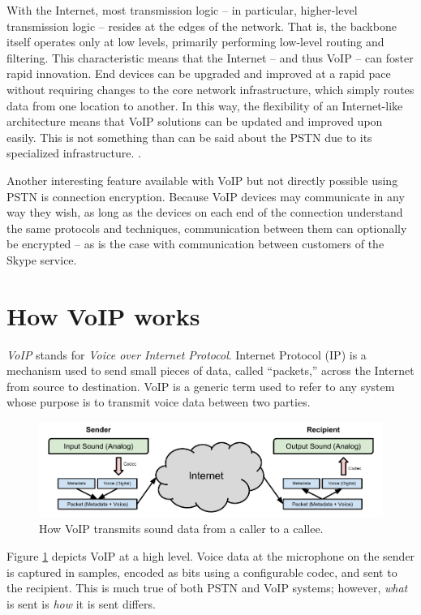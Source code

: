 \documentclass[11pt]{article}
\newcommand{\term}[1]{\textit{#1}}
\begin{document}
With the Internet, most transmission logic -- in particular, higher-level
transmission logic -- resides at the edges of the network. That is, the backbone
itself operates only at low levels, primarily performing low-level routing and
filtering. This characteristic means that the Internet -- and thus VoIP -- can
foster rapid innovation. End devices can be upgraded and improved at a rapid
pace without requiring changes to the core network infrastructure, which simply
routes data from one location to another. In this way, the flexibility of an
Internet-like architecture means that VoIP solutions can be updated and improved
upon easily.  This is not something than can be said about the PSTN due to its
specialized infrastructure. \cite{privateline}.

Another interesting feature available with VoIP but not directly possible using
PSTN is connection encryption. Because VoIP devices may communicate in any way
they wish, as long as the devices on each end of the connection understand the
same protocols and techniques, communication between them can optionally be
encrypted -- as is the case with communication between customers of the Skype
service. \cite{skype_encryption}

\section{How VoIP works}

\term{VoIP} stands for \term{Voice over Internet Protocol}. Internet Protocol
(IP) is a mechanism used to send small pieces of data, called ``packets,''
across the Internet from source to destination. VoIP is a generic term used to
refer to any system whose purpose is to transmit voice data between two parties.
\cite{goode}

\begin{figure}
	\centering
	\includegraphics[width=\textwidth]{voip_diagram}
	\caption{
		How VoIP transmits sound data from a caller to a callee.
	}
	\label{fig:voip_diagram}
\end{figure}

Figure \ref{fig:voip_diagram} depicts VoIP at a high level. Voice data at the
microphone on the sender is captured in samples, encoded as bits using a
configurable codec, and sent to the recipient. This is much true of both PSTN
and VoIP systems; however, \emph{what} is sent is \emph{how} it is sent differs.
\end{document}
